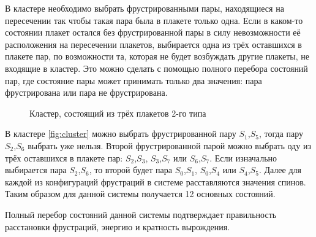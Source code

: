 \documentclass[utf8, babel, sor, jor, amsmath, amssymb, reprint]{elsarticle} %
\begin{document}
В кластере необходимо выбрать фрустрированными пары, находящиеся на пересечении так чтобы такая пара была в плакете только одна. Если в каком-то состоянии плакет остался без фрустрированной пары в силу невозможности её расположения на пересечении плакетов, выбирается одна из трёх оставшихся в плакете пар, по возможности та, которая не будет возбуждать другие плакеты, не входящие в кластер. Это можно сделать с помощью полного перебора состояний пар, где состояние пары может принимать только два значения: пара фрустрирована или пара не фрустрирована.

\begin{figure}[H]
	\centering
	\caption{Кластер, состоящий из трёх плакетов 2-го типа}
	\label{fig:cluster}
\end{figure}

В кластере \eqref{fig:cluster}  можно выбрать фрустрированной пару $S_1$,$S_5$, тогда пару  $S_2$,$S_6$ выбрать уже нельзя. Второй фрустрированной парой можно выбрать оду из трёх оставшихся в плакете пар: $S_2$,$S_3$, $S_3$,$S_7$ или $S_6$,$S_7$. Если изначально выбирается пара $S_2$,$S_6$, то второй будет пара $S_0$,$S_1$, $S_0$,$S_4$ или $S_4$,$S_5$. Далее для каждой из конфигураций фрустраций в системе расставляются значения спинов. Таким образом для данной системы получается 12 основных состояний. 

Полный перебор состояний данной системы подтверждает правильность расстановки фрустраций, энергию и кратность вырождения.
\end{document}
